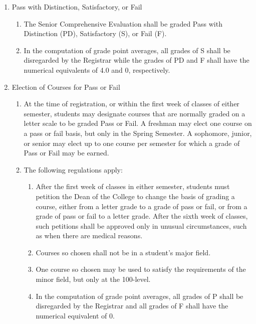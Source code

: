 \documentclass{manual}
\newcommand{\itemLevelA}{\alph*.}
\newcommand{\itemLevelB}{\arabic*)}
\newcommand{\itemLevelC}{\alph*)}
\newcommand{\itemRefA}{\alph*}
\newcommand{\itemRefB}{\arabic*}
\newcommand{\itemRefC}{\alph*}
\begin{document}
\begin{enumerate}[label=\itemLevelA,ref=\itemRefA]
	\item Pass with Distinction, Satisfactory, or Fail

		\begin{enumerate}[label=\itemLevelB,ref=\itemRefB]
		\item The Senior Comprehensive Evaluation shall be graded Pass with Distinction (PD), Satisfactory (S), or Fail (F). 
		\item In the computation of grade point averages, all grades of S shall be disregarded by the Registrar while the grades of PD and F shall have the numerical equivalents of 4.0 and 0, respectively.
		\end{enumerate}
	
	\item Election of Courses for Pass or Fail

		\begin{enumerate}[label=\itemLevelB,ref=\itemRefB]
		\item At the time of registration, or within the first week of classes of either semester, students may designate courses that are normally graded on a letter scale to be graded Pass or Fail. A freshman may elect one course on a pass or fail basis, but only in the Spring Semester. A sophomore, junior, or senior may elect up to one course per semester for which a grade of Pass or Fail may be earned. 
		\item The following regulations apply:

			\begin{enumerate}[label=\itemLevelC,ref=\itemRefC]
			\item After the first week of classes in either semester, students must petition the Dean of the College to change the basis of grading a course, either from a letter grade to a grade of pass or fail, or from a grade of pass or fail to a letter grade. After the sixth week of classes, such petitions shall be approved only in unusual circumstances, such as when there are medical reasons. 
			\item Courses so chosen shall not be in a student's major field. 
			\item One course so chosen may be used to satisfy the requirements of the minor field, but only at the 100-level. 
			\item In the computation of grade point averages, all grades of P shall be disregarded by the Registrar and all grades of F shall have the numerical equivalent of 0. 
			\end{enumerate}
	

\end{enumerate}
\end{enumerate}
\end{document}
